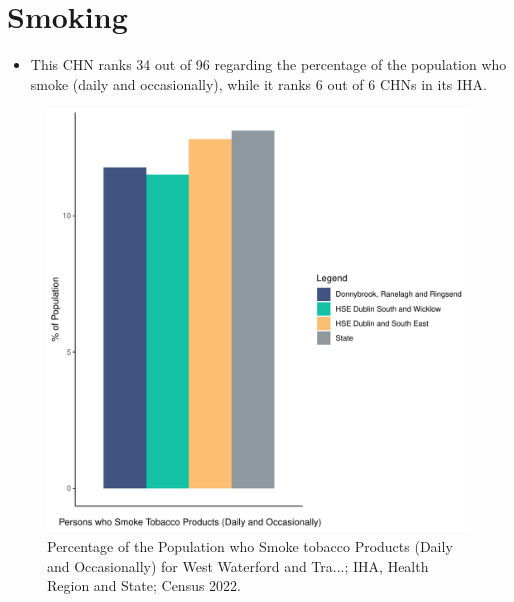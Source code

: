 \documentclass{article}
\begin{document}
\pagebreak

\section{Smoking}\label{sect:Smoking}
\begin{itemize}
\item This CHN ranks  34 out of 96 regarding the percentage of the population who smoke (daily and occasionally), while it ranks   6 out of 6 CHNs in its IHA.
\end{itemize}
\begin{figure}[H]
	\centering
	\includegraphics[width = 120mm]{../figures/SmokingED.pdf}
	\caption{Percentage of the Population who Smoke tobacco Products (Daily and Occasionally) for West Waterford and Tra...; IHA, Health Region and State; Census 2022.}
	\label{fig:2ae19629-1a6a-13a3-e055-000000000001}
	\end{figure}
	
\end{document}
